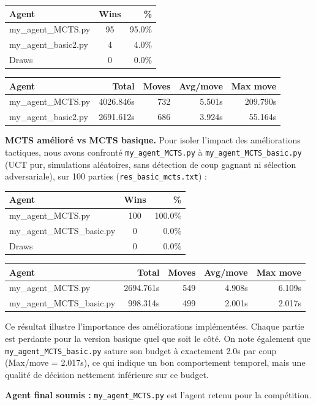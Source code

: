 \begin{tabular}{|l|c|r|}
    \hline
    Agent & Wins & \% \\
    \hline
    my\_agent\_MCTS.py & 95 & 95.0\% \\
    my\_agent\_basic2.py & 4 & 4.0\% \\
    Draws & 0 & 0.0\%\\
    \hline
\end{tabular}
\begin{tabular}{|l|r|r|r|r|}
    \hline
    Agent & Total & Moves & Avg/move & Max move \\
    \hline
    my\_agent\_MCTS.py & 4026.846s & 732 & 5.501s & 209.790s \\
    my\_agent\_basic2.py & 2691.612s & 686 & 3.924s & 55.164s \\
    \hline
\end{tabular}

\bigskip
\textbf{MCTS amélioré vs MCTS basique.} Pour isoler l'impact des améliorations tactiques, nous avons confronté \texttt{my\_agent\_MCTS.py} à \texttt{my\_agent\_MCTS\_basic.py} (UCT pur, simulations aléatoires, sans détection de coup gagnant ni sélection adversariale), sur 100 parties (\texttt{res\_basic\_mcts.txt}) :\\

\begin{tabular}{|l|c|r|}
    \hline
    Agent & Wins & \% \\
    \hline
    my\_agent\_MCTS.py & 100 & 100.0\% \\
    my\_agent\_MCTS\_basic.py & 0 & 0.0\% \\
    Draws & 0 & 0.0\%\\
    \hline
\end{tabular}
\begin{tabular}{|l|r|r|r|r|}
    \hline
    Agent & Total & Moves & Avg/move & Max move \\
    \hline
    my\_agent\_MCTS.py & 2694.761s & 549 & 4.908s & 6.109s \\
    my\_agent\_MCTS\_basic.py & 998.314s & 499 & 2.001s & 2.017s \\
    \hline
\end{tabular}

\bigskip
Ce résultat illustre l'importance des améliorations implémentées. Chaque partie est perdante pour la version basique quel que soit le côté. On note également que \texttt{my\_agent\_MCTS\_basic.py} sature son budget à exactement 2.0s par coup (Max/move = 2.017s), ce qui indique un bon comportement temporel, mais une qualité de décision nettement inférieure sur ce budget.

\textbf{Agent final soumis :} \texttt{my\_agent\_MCTS.py} est l'agent retenu pour la compétition.